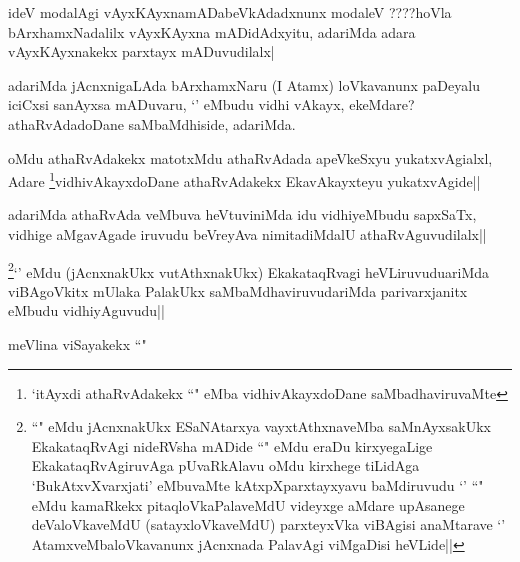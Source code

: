 \begin{artha}
ideV modalAgi vAyxKAyxnamADabeVkAdadxnunx modaleV ????hoVla bArxhamxNadalilx vAyxKAyxna mADidAdxyitu, adariMda adara vAyxKAyxnakekx parxtayx mADuvudilalx|
\end{artha}


\begin{artha}
adariMda jAcnxnigaLAda bArxhamxNaru (I Atamx) loVkavanunx paDeyalu iciCxsi sanAyxsa mADuvaru, `\stext' eMbudu vidhi vAkayx, ekeMdare? athaRvAdadoDane saMbaMdhiside, adariMda.
\end{artha}


\begin{artha}
oMdu athaRvAdakekx matotxMdu athaRvAdada apeVkeSxyu yukatxvAgialxl, Adare \footnote{`\stext itAyxdi athaRvAdakekx ``\stext" eMba vidhivAkayxdoDane saMbadhaviruvaMte}vidhivAkayxdoDane athaRvAdakekx EkavAkayxteyu yukatxvAgide||
\end{artha}

\begin{artha}
adariMda athaRvAda veMbuva heVtuviniMda idu vidhiyeMbudu sapxSaTx, vidhige aMgavAgade iruvudu beVreyAva nimitadiMdalU athaRvAguvudilalx||
\end{artha}


\begin{artha}
\footnote{``\stext" eMdu jAcnxnakUkx ESaNAtarxya vayxtAthxnaveMba saMnAyxsakUkx EkakataqRvAgi nideRVsha mADide ``\stext" eMdu eraDu kirxyegaLige EkakataqRvAgiruvAga pUvaRkAlavu oMdu kirxhege tiLidAga `BukAtxvXvarxjati' eMbuvaMte kAtxpXparxtayxyavu baMdiruvudu `\stext' ``\stext" eMdu kamaRkekx pitaqloVkaPalaveMdU videyxge aMdare upAsanege deValoVkaveMdU (satayxloVkaveMdU) parxteyxVka viBAgisi anaMtarave `\stext' AtamxveMbaloVkavanunx jAcnxnada PalavAgi viMgaDisi heVLide||}`\stext' eMdu (jAcnxnakUkx vutAthxnakUkx) EkakataqRvagi heVLiruvuduariMda viBAgoVkitx mUlaka PalakUkx saMbaMdhaviruvudariMda parivarxjanitx eMbudu vidhiyAguvudu|| 
\end{artha}

\begin{artha}
meVlina viSayakekx ``\stext"
\end{artha}


